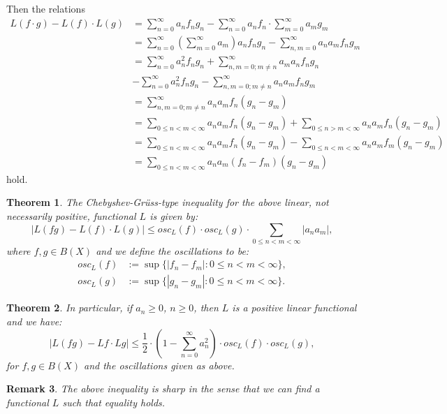 \documentclass[12pt,leqno,a4paper,dvips,twoside]{article}
\newtheorem{thm}{Theorem}[section]
\newtheorem{rema}[thm]{Remark}%
\begin{document}
{Then the relations
	\begin{align*}
		L(f\cdot g)-L(f)\cdot L(g)&=\sum^{\infty}_{n=0}{a_nf_ng_n}-\sum^{\infty}_{n=0}{a_nf_n}\cdot \sum^{\infty}_{m=0}{a_mg_m}\\
		&=\sum^{\infty}_{n=0}{\left(\sum^{\infty}_{m=0}{a_m}\right)a_nf_ng_n}-\sum^{\infty}_{n,m=0}{a_na_mf_ng_m}\\
		&=\sum^{\infty}_{n=0}{a^2_nf_ng_n}+\sum^{\infty}_{n,m=0; m\neq n}{a_ma_nf_ng_n}\\
		&-\sum^{\infty}_{n=0}{a^2_nf_ng_n}-\sum^{\infty}_{n,m=0; m\neq n}{a_na_mf_ng_m}\\
		&=\sum^{\infty}_{n,m=0; m\neq n}{a_na_mf_n(g_n-g_m)}\\
		&=\sum_{0\leq n<m< \infty}{a_na_m f_n(g_n-g_m)}+\sum_{0\leq n>m< \infty}{a_na_mf_n(g_n-g_m)}\\
		&=\sum_{0\leq n<m<\infty}{a_na_mf_n(g_n-g_m)}-\sum_{0\leq n<m< \infty}{a_na_mf_m(g_n-g_m)}\\
		&=\sum_{0\leq n<m< \infty}{a_na_m(f_n-f_m)(g_n-g_m)}
	\end{align*}
hold. 

\begin{thm}\label{th8}
The Chebyshev-Gr\"{u}ss-type inequality for the above linear, not necessarily positive, functional $L$ is given by:
	\begin{equation*}
		\left|L(fg)-L(f)\cdot L(g)\right| \leq osc_L(f)\cdot osc_L(g)\cdot \sum_{0\leq n<m< \infty}{\left|a_na_m\right|},
	\end{equation*}
where $f,g\in B(X)$  and we define the oscillations to be:
	\begin{align*}
		osc_L(f)&:=\sup\{\left|f_n-f_m\right|: 0\leq n<m< \infty\},\\
		osc_L(g)&:=\sup\{\left|g_n-g_m\right|: 0\leq n<m< \infty\}.
	\end{align*}
\end{thm}

\begin{thm}\label{th9}
In particular, if $a_n\geq 0$, $n\geq 0$, then $L$ is a positive linear functional and we have:
	\begin{equation*}
		\left|L(fg)-Lf\cdot Lg\right| \leq \frac{1}{2}\cdot \left(1-\sum^{\infty}_{n=0}{a^2_n}\right)\cdot osc_L(f)\cdot osc_L(g),
	\end{equation*}
for $f,g\in B(X)$ and the oscillations given as above.
\end{thm}

\begin{rema}
	The above inequality is sharp in the sense that we can find a functional $L$ such that equality holds. 
\end{rema}

}
\end{document}
